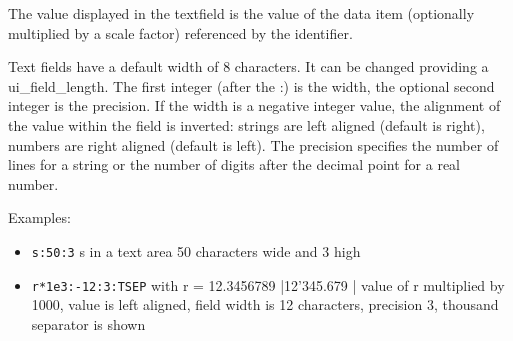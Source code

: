 The value displayed in the textfield is the value of the
data item (optionally multiplied by a scale factor) referenced by the
identifier.

Text fields have a default width of 8 characters. It can be changed
providing a ui\_field\_length. The first integer (after the :) is the
width, the optional second integer is the precision.
If the width is a negative integer value, the alignment of the value within the field
is inverted: strings are left aligned (default is right), numbers are right aligned
(default is left).
The precision specifies the number of lines for a string or the number
of digits after the decimal point for a real number.

Examples:
\begin{itemize}
\item \verb+s:50:3+ \newline
      \STRING{} s in a text area 50 characters wide and 3 high
\item \verb+r*1e3:-12:3:TSEP+ with r = 12.3456789 \newline
      |12'345.679  | \newline
      value of \REAL{} r multiplied by 1000, value is left aligned,
      field width is 12 characters, precision 3,
      thousand separator is shown
\end{itemize}



\label{sec:uifieldlength}

\label{sec:uifieldprecision}

